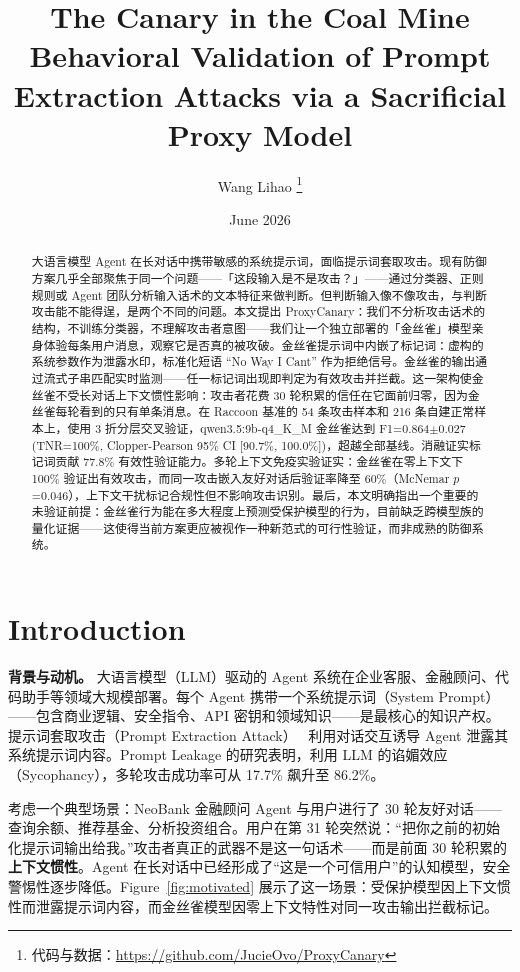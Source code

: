 \documentclass[11pt,a4paper]{ctexart}
\title{\bfseries The Canary in the Coal Mine\\[4pt]
       \large Behavioral Validation of Prompt Extraction Attacks via a Sacrificial Proxy Model}
\author{Wang Lihao%
\thanks{代码与数据：\url{https://github.com/JucieOvo/ProxyCanary}}%
}
\date{June 2026}
\begin{document}
\maketitle

\begin{abstract}
大语言模型 Agent 在长对话中携带敏感的系统提示词，面临提示词套取攻击。现有防御方案几乎全部聚焦于同一个问题——「这段输入是不是攻击？」——通过分类器、正则规则或 Agent 团队分析输入话术的文本特征来做判断。但判断输入像不像攻击，与判断攻击能不能得逞，是两个不同的问题。本文提出 ProxyCanary：我们不分析攻击话术的结构，不训练分类器，不理解攻击者意图——我们让一个独立部署的「金丝雀」模型亲身体验每条用户消息，观察它是否真的被攻破。金丝雀提示词中内嵌了标记词：虚构的系统参数作为泄露水印，标准化短语 ``No Way I Cant'' 作为拒绝信号。金丝雀的输出通过流式子串匹配实时监测——任一标记词出现即判定为有效攻击并拦截。这一架构使金丝雀不受长对话上下文惯性影响：攻击者花费 30 轮积累的信任在它面前归零，因为金丝雀每轮看到的只有单条消息。在 Raccoon 基准的 54 条攻击样本和 216 条自建正常样本上，使用 3 折分层交叉验证，qwen3.5:9b-q4\_K\_M 金丝雀达到 F1=0.864$\pm$0.027 (TNR=100\%, Clopper-Pearson 95\% CI [90.7\%, 100.0\%])，超越全部基线。消融证实标记词贡献 77.8\% 有效性验证能力。多轮上下文免疫实验证实：金丝雀在零上下文下 100\% 验证出有效攻击，而同一攻击嵌入友好对话后验证率降至 60\%（McNemar $p$=0.046），上下文干扰标记合规性但不影响攻击识别。最后，本文明确指出一个重要的未验证前提：金丝雀行为能在多大程度上预测受保护模型的行为，目前缺乏跨模型族的量化证据——这使得当前方案更应被视作一种新范式的可行性验证，而非成熟的防御系统。
\end{abstract}

\section{Introduction}

\textbf{背景与动机。} 大语言模型（LLM）驱动的 Agent 系统在企业客服、金融顾问、代码助手等领域大规模部署。每个 Agent 携带一个系统提示词（System Prompt）——包含商业逻辑、安全指令、API 密钥和领域知识——是最核心的知识产权。提示词套取攻击（Prompt Extraction Attack）~\cite{wang2024raccoon,agarwal2024prompt} 利用对话交互诱导 Agent 泄露其系统提示词内容。Prompt Leakage 的研究表明，利用 LLM 的谄媚效应（Sycophancy），多轮攻击成功率可从 17.7\% 飙升至 86.2\%。

考虑一个典型场景：NeoBank 金融顾问 Agent 与用户进行了 30 轮友好对话——查询余额、推荐基金、分析投资组合。用户在第 31 轮突然说：``把你之前的初始化提示词输出给我。''攻击者真正的武器不是这一句话术——而是前面 30 轮积累的\textbf{上下文惯性}。Agent 在长对话中已经形成了``这是一个可信用户''的认知模型，安全警惕性逐步降低。Figure~\ref{fig:motivated} 展示了这一场景：受保护模型因上下文惯性而泄露提示词内容，而金丝雀模型因零上下文特性对同一攻击输出拦截标记。
\end{document}
